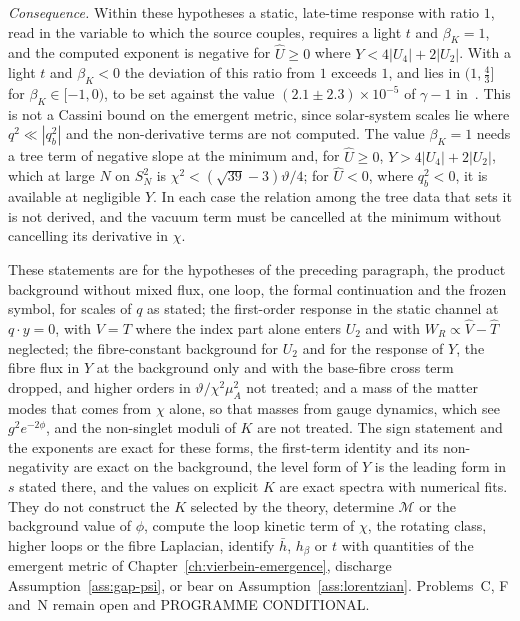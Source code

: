 \emph{Consequence.} Within these hypotheses a static, late-time response with ratio \(1\), read in the variable to which the source couples, requires a light \(t\) and \(\beta_K=1\), and the computed exponent is negative for \(\hat U\ge0\) where \(Y<4|U_4|+2|U_2|\). With a light \(t\) and \(\beta_K<0\) the deviation of this ratio from \(1\) exceeds \(1\), and lies in \((1,\tfrac43]\) for \(\beta_K\in[-1,0)\), to be set against the value \((2.1\pm2.3)\times10^{-5}\) of \(\gamma-1\) in~\cite{Bertotti2003}. This is not a Cassini bound on the emergent metric, since solar-system scales lie where \(q^2\ll|q_b^2|\) and the non-derivative terms are not computed. The value \(\beta_K=1\) needs a tree term of negative slope at the minimum and, for \(\hat U\ge0\), \(Y>4|U_4|+2|U_2|\), which at large \(N\) on \(S^2_N\) is \(\chi^2<(\sqrt{39}-3)\vartheta/4\); for \(\hat U<0\), where \(q_b^2<0\), it is available at negligible \(Y\). In each case the relation among the tree data that sets it is not derived, and the vacuum term must be cancelled at the minimum without cancelling its derivative in \(\chi\).

These statements are for the hypotheses of the preceding paragraph, the product background without mixed flux, one loop, the formal continuation and the frozen symbol, for scales of \(q\) as stated; the first-order response in the static channel at \(q\cdot y=0\), with \(V=T\) where the index part alone enters \(U_2\) and with \(W_R\propto\hat V-\hat T\) neglected; the fibre-constant background for \(U_2\) and for the response of \(Y\), the fibre flux in \(Y\) at the background only and with the base-fibre cross term dropped, and higher orders in \(\vartheta/\chi^2\mu_A^2\) not treated; and a mass of the matter modes that comes from \(\chi\) alone, so that masses from gauge dynamics, which see \(g^2e^{-2\phi}\), and the non-singlet moduli of \(K\) are not treated. The sign statement and the exponents are exact for these forms, the first-term identity and its non-negativity are exact on the background, the level form of \(Y\) is the leading form in \(s\) stated there, and the values on explicit \(K\) are exact spectra with numerical fits. They do not construct the \(K\) selected by the theory, determine \(\mathcal M\) or the background value of \(\phi\), compute the loop kinetic term of \(\chi\), the rotating class, higher loops or the fibre Laplacian, identify \(\bar h\), \(h_\beta\) or \(t\) with quantities of the emergent metric of Chapter~\ref{ch:vierbein-emergence}, discharge Assumption~\ref{ass:gap-psi}, or bear on Assumption~\ref{ass:lorentzian}. Problems~C, F and~N remain open and PROGRAMME CONDITIONAL.

